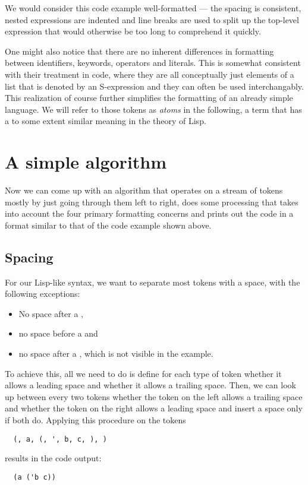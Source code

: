 We would consider this code example well-formatted ---
the spacing is consistent,
nested expressions are indented and
line breaks are used to split up the top-level expression
that would otherwise be too long to comprehend it quickly.

One might also notice that there are no inherent differences in formatting
between identifiers, keywords, operators and literals.
This is somewhat consistent with their treatment in code,
where they are all conceptually just elements of a list that is denoted by an
S-expression and they can often be used interchangably.
This realization of course further simplifies the formatting of an already simple language.
We will refer to those tokens as \textit{atoms} in the following,
a term that has a to some extent similar meaning in the theory of Lisp.

\section{A simple algorithm}
Now we can come up with an algorithm that operates on a stream of tokens
mostly by just going through them left to right,
does some processing that takes into account the four primary formatting concerns and
prints out the code in a format similar to that of the code example shown above.

\subsection{Spacing}
For our Lisp-like syntax, we want to separate most tokens with a space, with the following exceptions:
\begin{itemize}
  \item No space after a ,
  \item no space before a  and
  \item no space after a , which is not visible in the example.
\end{itemize}

To achieve this, all we need to do is define for each type of token
whether it allows a leading space and whether it allows a trailing space.
Then, we can look up between every two tokens
whether the token on the left allows a trailing space and
whether the token on the right allows a leading space and
insert a space only if both do.
Applying this procedure on the tokens
\begin{verbatim}
  (, a, (, ', b, c, ), )
\end{verbatim}
results in the code output:
\begin{verbatim}
  (a ('b c))
\end{verbatim}

